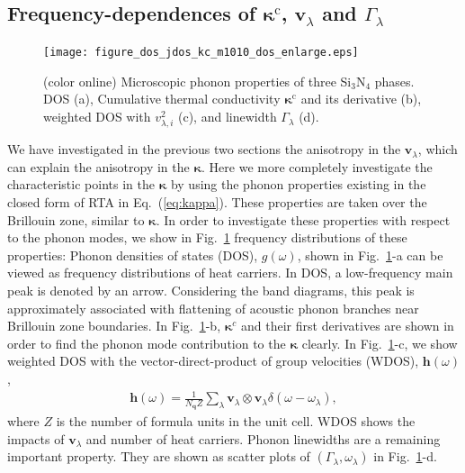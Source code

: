 \documentclass[twocolumn,amsmath,amssymb,a4paper,prb,superscriptaddress,floatfix]{revtex4-1}
\begin{document}
\subsection{Frequency-dependences of $\boldsymbol{\kappa}^\text{c}$, $\mathbf{v}$$_\lambda$ and $\Gamma_\lambda$}

\begin{figure}[ht]
 \begin{center}
  \texttt{[image: figure\_dos\_jdos\_kc\_m1010\_dos\_enlarge.eps]}
  \caption{(color online) Microscopic phonon properties of three Si$_3$N$_4$
	  phases. DOS (a), Cumulative thermal conductivity $\mathbf{\kappa}^\text{c}$ and its derivative
	  (b), weighted DOS with $v_{\lambda,i}^2$ (c), and linewidth $\Gamma_\lambda$ (d).
  \label{fig:Fig5_338_rev} }
 \end{center}
\end{figure}

We have investigated in the previous two sections the anisotropy in the
$\mathbf{v}_\lambda$, which can explain the anisotropy in the
$\boldsymbol{\kappa}$. Here we more completely investigate the characteristic
points in the $\boldsymbol{\kappa}$ by using the phonon properties existing in
the closed form of RTA in Eq.~(\ref{eq:kappa}). These properties are taken over
the Brillouin zone, similar to $\boldsymbol{\kappa}$.  In order to investigate
these properties with respect to the phonon modes, we show in
Fig.~\ref{fig:Fig5_338_rev} frequency distributions of these properties: Phonon
densities of states (DOS), $g(\omega)$, shown in Fig.~\ref{fig:Fig5_338_rev}-a
can be viewed as frequency distributions of heat carriers.  In DOS, a
low-frequency main peak is denoted by an arrow. Considering the band diagrams,
this peak is approximately associated with flattening of acoustic phonon
branches near Brillouin zone boundaries.  In Fig.~\ref{fig:Fig5_338_rev}-b,
$\boldsymbol{\kappa}^c$ and their first derivatives are shown in order to find
the phonon mode contribution to the $\boldsymbol{\kappa}$ clearly. In
Fig.~\ref{fig:Fig5_338_rev}-c, we show weighted DOS with the
vector-direct-product of group velocities (WDOS), $\boldsymbol{h}(\omega)$,
\begin{align}
 \label{eq:wdos}
 \boldsymbol{h}(\omega) = \frac{1}{N_\mathbf{q}Z}
 \sum_\lambda
 \mathbf{v}_\lambda \otimes \mathbf{v}_\lambda
 \delta(\omega-\omega_{\lambda}),
\end{align}
where $Z$ is the number of formula units in the unit cell. WDOS shows the
impacts of $\mathbf{v}_\lambda$ and number of heat carriers.  Phonon linewidths
are a remaining important property.  They are shown as scatter plots of
$(\Gamma_\lambda, \omega_\lambda)$ in Fig.~\ref{fig:Fig5_338_rev}-d. 
\end{document}
